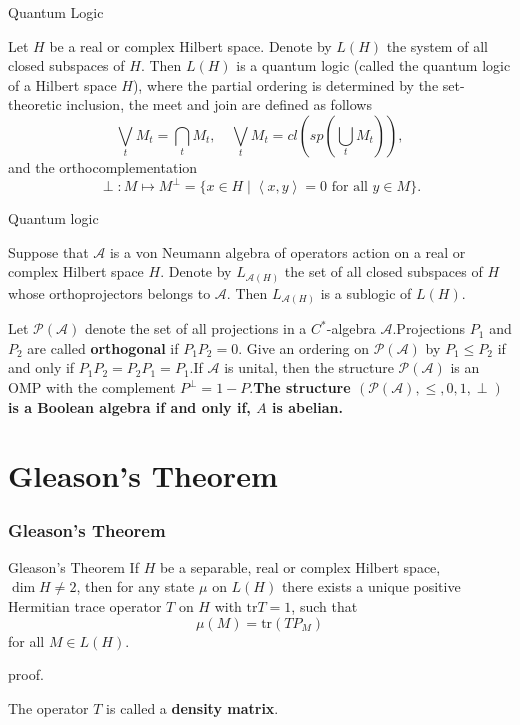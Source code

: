 \documentclass{beamer}
\begin{document}
\begin{frame}{Quantum Logic}
    \begin{example}
        Let \(H\) be a real or complex Hilbert space. Denote by \(L(H)\) the system of all closed subspaces of \(H\). Then \(L(H)\) is a quantum logic (called the quantum logic of a Hilbert space \(H\)), where the partial ordering is determined by the set-theoretic inclusion, the meet and join are defined as follows
        \[\bigvee_t M_t = \bigcap_t M_t, \quad \bigvee_t M_t = cl(sp(\bigcup_t M_t)),\]
        and the orthocomplementation \[\perp: M \mapsto M^\perp = \{x \in H \mid \left \langle x,y \right \rangle =0 \mbox{ for all } y \in M\}.\]
    \end{example}
\end{frame}

\begin{frame}{Quantum logic}
    \begin{example}
        Suppose that \(\mathcal{A}\) is a von Neumann algebra of operators action on a real or complex Hilbert space \(H\). Denote by \(L_{\mathcal{A}(H)}\) the set of all closed subspaces of \(H\) whose orthoprojectors belongs to \(\mathcal{A}\). Then \(L_{\mathcal{A}(H)}\) is a sublogic of \(L(H)\).
    \end{example}\pause
    \begin{example}
        Let \(\mathcal{P}(\mathcal{A})\) denote the set of all projections in a \(C^\ast\)-algebra \(\mathcal{A}\).\pause Projections \(P_1\) and \(P_2\) are called \textbf{orthogonal} if \(P_1P_2 =0\). Give an ordering on \(\mathcal{P}(\mathcal{A})\) by \(P_1 \le P_2\) if and only if \(P_1P_2=P_2P_1=P_1\).\pause If \(\mathcal{A}\) is unital, then the structure \(\mathcal{P}(\mathcal{A})\) is an OMP with the complement \(P^\perp=1-P\).\pause \textbf{The structure \((\mathcal{P}(\mathcal{A}),\le,0,1,\perp)\) is a Boolean algebra if and only if, \(A\) is abelian.}
    \end{example}
\end{frame}

\section{Gleason's Theorem}
\begin{frame}
    \frametitle{Gleason's Theorem}
\begin{block}{Gleason's Theorem}
    If \(H\) be a separable, real or complex Hilbert space, \(\dim H \neq 2\), then for any state \(\mu\) on \(L(H)\) there exists a unique positive Hermitian trace operator \(T\) on \(H\) with \(\mathrm{tr} T =1\), such that
    \[\mu(M) = \mathrm{tr}(TP_M)\]
    for all \(M \in L(H)\).
\end{block}
proof. \cite[p.131-149]{MR1256736}

The operator \(T\) is called a \textbf{density matrix}.
\end{frame}
\end{document}
